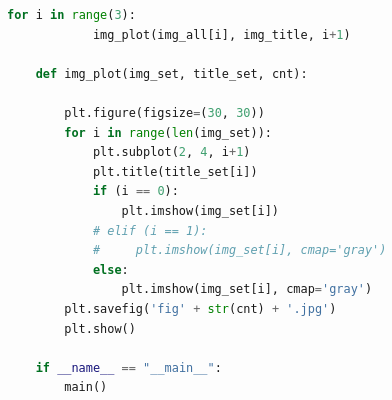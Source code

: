 \documentclass{article}
\begin{document}
{\begin{lstlisting}[language=Python, caption=Code for performing morphological operations in a binary image]
        for i in range(3):
            img_plot(img_all[i], img_title, i+1)
    
    def img_plot(img_set, title_set, cnt):
        
        plt.figure(figsize=(30, 30))
        for i in range(len(img_set)):
            plt.subplot(2, 4, i+1)
            plt.title(title_set[i])
            if (i == 0):
                plt.imshow(img_set[i])
            # elif (i == 1):
            #     plt.imshow(img_set[i], cmap='gray')
            else: 
                plt.imshow(img_set[i], cmap='gray')
        plt.savefig('fig' + str(cnt) + '.jpg')
        plt.show()
    
    if __name__ == "__main__":
        main()

    \end{lstlisting}
    \\
    
}
\end{document}
